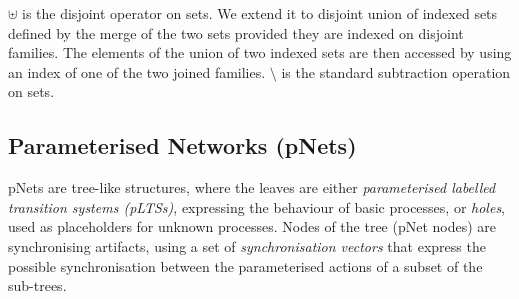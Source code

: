 \documentclass{lncs/llncs}
\begin{document}
$\uplus$ is the disjoint operator on sets. We extend it to  disjoint union  of indexed 
sets defined by the merge of the 
two sets provided they are indexed on disjoint families.
The elements
of the union of two indexed sets are then accessed by using an index of one of the two
joined families.
$\setminus$ is the standard subtraction operation on sets.




\subsection{Parameterised Networks (pNets)}
\label{section:pnets}

pNets are tree-like structures, where the leaves are either
\emph{parameterised labelled transition systems (pLTSs)}, expressing the
behaviour of basic processes, or \emph{holes}, used as placeholders
for unknown processes. 
Nodes of the tree (pNet nodes) are synchronising artifacts, using a
set of \emph{synchronisation vectors} that express the possible
synchronisation between the parameterised actions of a subset of the
sub-trees.
\end{document}
